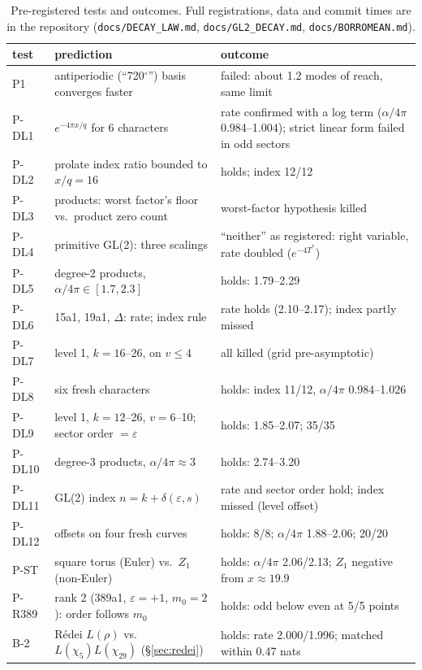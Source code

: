 \documentclass[11pt]{article}
\theoremstyle{remark}
\begin{document}
\begin{table}[h]
\centering\small
\begin{tabular}{@{}p{1.6cm}p{6.6cm}p{6.4cm}@{}}
\toprule
test & prediction & outcome\\
\midrule
P1 & antiperiodic (``720$^\circ$'') basis converges faster & failed: about 1.2 modes of reach, same limit\\
P-DL1 & $e^{-4\pi x/q}$ for 6 characters & rate confirmed with a log term ($\alpha/4\pi$ 0.984--1.004); strict linear form failed in odd sectors\\
P-DL2 & prolate index ratio bounded to $x/q=16$ & holds; index 12/12\\
P-DL3 & products: worst factor's floor vs.\ product zero count & worst-factor hypothesis killed\\
P-DL4 & primitive GL(2): three scalings & ``neither'' as registered: right variable, rate doubled ($e^{-4T^*}$)\\
P-DL5 & degree-2 products, $\alpha/4\pi\in[1.7,2.3]$ & holds: 1.79--2.29\\
P-DL6 & 15a1, 19a1, $\Delta$: rate; index rule & rate holds (2.10--2.17); index partly missed\\
P-DL7 & level 1, $k=16$--26, on $v\le4$ & all killed (grid pre-asymptotic)\\
P-DL8 & six fresh characters & holds: index 11/12, $\alpha/4\pi$ 0.984--1.026\\
P-DL9 & level 1, $k=12$--26, $v=6$--10; sector order $=\varepsilon$ & holds: 1.85--2.07; 35/35\\
P-DL10 & degree-3 products, $\alpha/4\pi\approx3$ & holds: 2.74--3.20\\
P-DL11 & GL(2) index $n=k+\delta(\varepsilon,s)$ & rate and sector order hold; index missed (level offset)\\
P-DL12 & offsets on four fresh curves & holds: 8/8; $\alpha/4\pi$ 1.88--2.06; 20/20\\
P-ST & square torus (Euler) vs.\ $Z_1$ (non-Euler) & holds: $\alpha/4\pi$ 2.06/2.13; $Z_1$ negative from $x\approx19.9$\\
P-R389 & rank 2 (389a1, $\varepsilon=+1$, $m_0=2$): order follows $m_0$ & holds: odd below even at 5/5 points\\
B-2 & Rédei $L(\rho)$ vs.\ $L(\chi_5)L(\chi_{29})$ (\S\ref{sec:redei}) & holds: rate 2.000/1.996; matched within 0.47 nats\\
\bottomrule
\end{tabular}
\caption{Pre-registered tests and outcomes. Full registrations, data and commit times are in the repository (\texttt{docs/DECAY\_LAW.md}, \texttt{docs/GL2\_DECAY.md}, \texttt{docs/BORROMEAN.md}).}\label{tab:tests}
\end{table}
\end{document}
